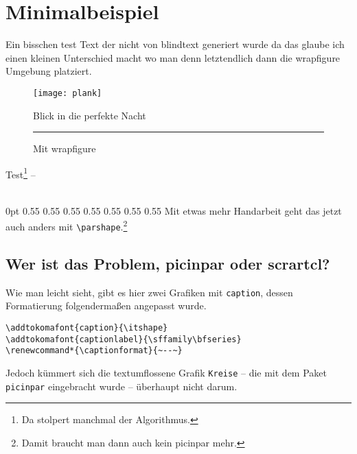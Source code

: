 \documentclass[a4paper,fontsize=11pt,parskip=half]{scrartcl}
\renewcommand*{\captionformat}{~--~}
\begin{document}
 
\section*{Minimalbeispiel} 
Ein bisschen test Text der nicht von blindtext generiert wurde da das 
glaube ich einen kleinen Unterschied macht wo man denn letztendlich 
dann die wrapfigure Umgebung platziert. 

\begin{figure}[h!] 
\centering 
\texttt{[image: plank]} 
\caption{Blick in die perfekte Nacht} 
\end{figure} 

\begin{figwindow} 
\lipsum*[3] 
\end{figwindow} 

\begin{wrapfigure}[9]{l}{6cm}%
\vspace{-0.8\baselineskip} 
\centering%
\rule{6cm}{3.2cm}%
\caption{Mit wrapfigure} 
\end{wrapfigure}%
Test\footnote{Da stolpert manchmal der Algorithmus.} -- \lipsum*[6-8] 

\vspace{\parskip} 
\hfill{}\\[\dimexpr-2\baselineskip-2\parskip] 

0pt \textwidth 0pt \textwidth 
0pt 0.55\textwidth 0pt 0.55\textwidth 
0pt 0.55\textwidth 0pt 0.55\textwidth 
0pt 0.55\textwidth 0pt 0.55\textwidth 0pt 0.55\textwidth 
0pt \textwidth 0pt \textwidth 
Mit etwas mehr Handarbeit geht das jetzt auch anders mit 
\texttt{\textbackslash parshape}.\footnote{Damit braucht man 
dann auch kein picinpar mehr.} \lipsum[1] 

\subsection*{Wer ist das Problem, picinpar oder scrartcl?} 
Wie man leicht sieht, gibt es hier zwei Grafiken mit \texttt{caption}, 
dessen Formatierung folgendermaßen angepasst wurde. 

\begin{Verbatim}[fontsize=\footnotesize] 
\addtokomafont{caption}{\itshape} 
\addtokomafont{captionlabel}{\sffamily\bfseries} 
\renewcommand*{\captionformat}{~--~} 
\end{Verbatim} 

Jedoch kümmert sich die textumflossene Grafik \texttt{Kreise} -- die mit 
dem Paket \texttt{picinpar} eingebracht wurde -- überhaupt nicht darum. 
\end{document}
